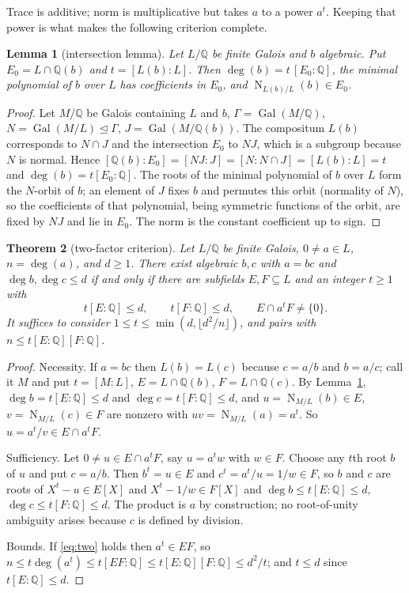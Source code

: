 \documentclass[11pt,a4paper]{article}
\newtheorem{theorem}{Theorem}[section]
\newtheorem{lemma}[theorem]{Lemma}
\theoremstyle{definition}
\theoremstyle{remark}
\newcommand{\Q}{\mathbb{Q}}
\newcommand{\Gal}{\operatorname{Gal}}
\newcommand{\Nm}{\operatorname{N}}
\newcommand{\dg}{\deg}
\begin{document}
Trace is additive; norm is multiplicative but takes $a$ to a power $a^t$.  Keeping that power is what
makes the following criterion complete.

\begin{lemma}[intersection lemma]\label{lem:intersection}
Let $L/\Q$ be finite Galois and $b$ algebraic.  Put $E_0=L\cap\Q(b)$ and $t=[L(b):L]$.  Then
$\dg(b)=t\,[E_0:\Q]$, the minimal polynomial of $b$ over $L$ has coefficients in $E_0$, and
$\Nm_{L(b)/L}(b)\in E_0$.
\end{lemma}

\begin{proof}
Let $M/\Q$ be Galois containing $L$ and $b$, $\Gamma=\Gal(M/\Q)$, $N=\Gal(M/L)\trianglelefteq\Gamma$,
$J=\Gal(M/\Q(b))$.  The compositum $L(b)$ corresponds to $N\cap J$ and the intersection $E_0$ to $NJ$,
which is a subgroup because $N$ is normal.  Hence $[\Q(b):E_0]=[NJ:J]=[N:N\cap J]=[L(b):L]=t$ and
$\dg(b)=t[E_0:\Q]$.  The roots of the minimal polynomial of $b$ over $L$ form the $N$-orbit of $b$;
an element of $J$ fixes $b$ and permutes this orbit (normality of $N$), so the coefficients of that
polynomial, being symmetric functions of the orbit, are fixed by $NJ$ and lie in $E_0$.  The norm is
the constant coefficient up to sign.
\end{proof}

\begin{theorem}[two-factor criterion]\label{thm:two}
Let $L/\Q$ be finite Galois, $0\ne a\in L$, $n=\dg(a)$, and $d\ge1$.  There exist algebraic $b,c$ with
$a=bc$ and $\dg b,\dg c\le d$ if and only if there are subfields $E,F\subseteq L$ and an integer $t\ge1$
with
\begin{equation}\label{eq:two}
 t[E:\Q]\le d,\qquad t[F:\Q]\le d,\qquad E\cap a^tF\ne\{0\}.
\end{equation}
It suffices to consider $1\le t\le\min(d,\lfloor d^2/n\rfloor)$, and pairs with
$n\le t[E:\Q][F:\Q]$.
\end{theorem}

\begin{proof}
Necessity.  If $a=bc$ then $L(b)=L(c)$ because $c=a/b$ and $b=a/c$; call it $M$ and put $t=[M:L]$,
$E=L\cap\Q(b)$, $F=L\cap\Q(c)$.  By Lemma~\ref{lem:intersection}, $\dg b=t[E:\Q]\le d$ and
$\dg c=t[F:\Q]\le d$, and $u=\Nm_{M/L}(b)\in E$, $v=\Nm_{M/L}(c)\in F$ are nonzero with
$uv=\Nm_{M/L}(a)=a^t$.  So $u=a^t/v\in E\cap a^tF$.

Sufficiency.  Let $0\ne u\in E\cap a^tF$, say $u=a^tw$ with $w\in F$.  Choose any $t$th root $b$ of
$u$ and put $c=a/b$.  Then $b^t=u\in E$ and $c^t=a^t/u=1/w\in F$, so $b$ and $c$ are roots of
$X^t-u\in E[X]$ and $X^t-1/w\in F[X]$ and $\dg b\le t[E:\Q]\le d$, $\dg c\le t[F:\Q]\le d$.  The
product is $a$ by construction; no root-of-unity ambiguity arises because $c$ is defined by division.

Bounds.  If \eqref{eq:two} holds then $a^t\in EF$, so $n\le t\dg(a^t)\le t[EF:\Q]\le t[E:\Q][F:\Q]
\le d^2/t$; and $t\le d$ since $t[E:\Q]\le d$.
\end{proof}
\end{document}
